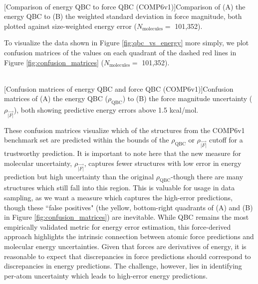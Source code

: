 \begin{flushleft}
\begin{multiFigure}
\centering
     \\
[Comparison of energy QBC to force QBC (COMP6v1)]{Comparison of (A) the energy QBC to (B) the weighted standard deviation in force magnitude, both plotted against size-weighted energy error ($N_\text{molecules}=$ 101,352).}
\label{fig:qbc_vs_energy}
\end{multiFigure}
\end{flushleft}

To visualize the data shown in Figure \ref{fig:qbc_vs_energy} more simply, we plot confusion matrices of the values on each quadrant of the dashed red lines in Figure \ref{fig:confusion_matrices} ($N_\text{molecules}=$ 101,352).

\begin{flushleft}
\begin{multiFigure}
\centering
     \\
[Confusion matrices of energy QBC and force QBC (COMP6v1)]{Confusion matrices of (A) the energy QBC ($\rho_\text{QBC}$) to (B) the force magnitude uncertainty ($\rho_{\vec{|F|}}$), both showing predictive energy errors above 1.5 kcal/mol.}
\label{fig:confusion_matrices}
\end{multiFigure}
\end{flushleft}

These confusion matrices visualize which of the structures from the COMP6v1 benchmark set are predicted within the bounds of the $\rho_\text{QBC}$ or $\rho_{\vec{|F|}}$ cutoff for a trustworthy prediction. 
It is important to note here that the new measure for molecular uncertainty, $\rho_{\vec{|F|}}$, captures fewer structures with low error in energy prediction but high uncertainty than the original $\rho_\text{QBC}$-though there are many structures which still fall into this region.
This is valuable for usage in data sampling, as we want a measure which captures the high-error predictions, though these ``false positives" (the yellow, bottom-right quadrants of (A) and (B) in Figure \ref{fig:confusion_matrices}) are inevitable.
While QBC remains the most empirically validated metric for energy error estimation, this force-derived approach highlights the intrinsic connection between atomic force predictions and molecular energy uncertainties. 
Given that forces are derivatives of energy, it is reasonable to expect that discrepancies in force predictions should correspond to discrepancies in energy predictions. 
The challenge, however, lies in identifying per-atom uncertainty which leads to high-error energy predictions.

